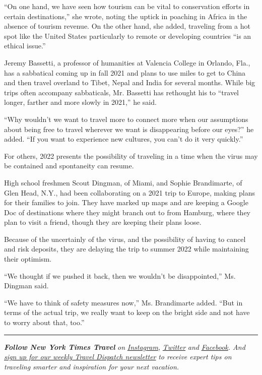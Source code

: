 ``On one hand, we have seen how tourism can be vital to conservation
efforts in certain destinations,'' she wrote, noting the uptick in
poaching in Africa in the absence of tourism revenue. On the other hand,
she added, traveling from a hot spot like the United States particularly
to remote or developing countries ``is an ethical issue.''

Jeremy Bassetti, a professor of humanities at Valencia College in
Orlando, Fla., has a sabbatical coming up in fall 2021 and plans to use
miles to get to China and then travel overland to Tibet, Nepal and India
for several months. While big trips often accompany sabbaticals, Mr.
Bassetti has rethought his to ``travel longer, farther and more slowly
in 2021,'' he said.

``Why wouldn't we want to travel more to connect more when our
assumptions about being free to travel wherever we want is disappearing
before our eyes?'' he added. ``If you want to experience new cultures,
you can't do it very quickly.''

For others, 2022 presents the possibility of traveling in a time when
the virus may be contained and spontaneity can resume.

High school freshmen Scout Dingman, of Miami, and Sophie Brandimarte, of
Glen Head, N.Y., had been collaborating on a 2021 trip to Europe, making
plans for their families to join. They have marked up maps and are
keeping a Google Doc of destinations where they might branch out to from
Hamburg, where they plan to visit a friend, though they are keeping
their plans loose.

Because of the uncertainly of the virus, and the possibility of having
to cancel and risk deposits, they are delaying the trip to summer 2022
while maintaining their optimism.

``We thought if we pushed it back, then we wouldn't be disappointed,''
Ms. Dingman said.

``We have to think of safety measures now,'' Ms. Brandimarte added.
``But in terms of the actual trip, we really want to keep on the bright
side and not have to worry about that, too.''

\begin{center}\rule{0.5\linewidth}{\linethickness}\end{center}

\emph{\textbf{Follow New York Times Travel}} \emph{on}
\href{https://www.instagram.com/nytimestravel/}{\emph{Instagram}}\emph{,}
\href{https://twitter.com/nytimestravel}{\emph{Twitter}} \emph{and}
\href{https://www.facebookcorewwwi.onion/nytimestravel/}{\emph{Facebook}}\emph{.
And}
\href{https://www.nytimes3xbfgragh.onion/newsletters/traveldispatch}{\emph{sign
up for our weekly Travel Dispatch newsletter}} \emph{to receive expert
tips on traveling smarter and inspiration for your next vacation.}

